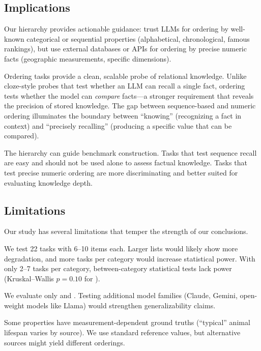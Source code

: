 \subsection{Implications}

Our hierarchy provides actionable guidance: trust LLMs for ordering by well-known categorical or sequential properties (alphabetical, chronological, famous rankings), but use external databases or APIs for ordering by precise numeric facts (geographic measurements, specific dimensions).

Ordering tasks provide a clean, scalable probe of relational knowledge.
Unlike cloze-style probes that test whether an LLM can recall a single fact, ordering tests whether the model can \emph{compare} facts---a stronger requirement that reveals the precision of stored knowledge.
The gap between sequence-based and numeric ordering illuminates the boundary between ``knowing'' (recognizing a fact in context) and ``precisely recalling'' (producing a specific value that can be compared).

The \benchname hierarchy can guide benchmark construction.
Tasks that test sequence recall are easy and should not be used alone to assess factual knowledge.
Tasks that test precise numeric ordering are more discriminating and better suited for evaluating knowledge depth.

\subsection{Limitations}
\label{sec:limitations}

Our study has several limitations that temper the strength of our conclusions.

We test 22 tasks with 6--10 items each.
Larger lists would likely show more degradation, and more tasks per category would increase statistical power.
With only 2--7 tasks per category, between-category statistical tests lack power (Kruskal--Wallis $p = 0.10$ for \gptlarge).

We evaluate only \gptlarge and \gptsmall.
Testing additional model families (Claude, Gemini, open-weight models like Llama) would strengthen generalizability claims.

Some properties have measurement-dependent ground truths (\eg ``typical'' animal lifespan varies by source).
We use standard reference values, but alternative sources might yield different orderings.

